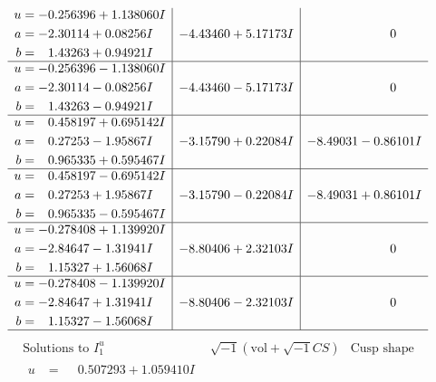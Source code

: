 \documentclass[1p]{elsarticle_modified}
\theoremstyle{definition}
\newcommand{\I}{\sqrt{-1}}
\begin{document}
$$\begin{array}{c|c|c}
\begin{aligned}
u &= -0.256396 + 1.138060 I \\
a &= -2.30114 + 0.08256 I \\
b &= \phantom{-}1.43263 + 0.94921 I\end{aligned}
 & -4.43460 + 5.17173 I & \phantom{-0.000000 } 0 \\ \hline\begin{aligned}
u &= -0.256396 - 1.138060 I \\
a &= -2.30114 - 0.08256 I \\
b &= \phantom{-}1.43263 - 0.94921 I\end{aligned}
 & -4.43460 - 5.17173 I & \phantom{-0.000000 } 0 \\ \hline\begin{aligned}
u &= \phantom{-}0.458197 + 0.695142 I \\
a &= \phantom{-}0.27253 - 1.95867 I \\
b &= \phantom{-}0.965335 + 0.595467 I\end{aligned}
 & -3.15790 + 0.22084 I & -8.49031 - 0.86101 I \\ \hline\begin{aligned}
u &= \phantom{-}0.458197 - 0.695142 I \\
a &= \phantom{-}0.27253 + 1.95867 I \\
b &= \phantom{-}0.965335 - 0.595467 I\end{aligned}
 & -3.15790 - 0.22084 I & -8.49031 + 0.86101 I \\ \hline\begin{aligned}
u &= -0.278408 + 1.139920 I \\
a &= -2.84647 - 1.31941 I \\
b &= \phantom{-}1.15327 + 1.56068 I\end{aligned}
 & -8.80406 + 2.32103 I & \phantom{-0.000000 } 0 \\ \hline\begin{aligned}
u &= -0.278408 - 1.139920 I \\
a &= -2.84647 + 1.31941 I \\
b &= \phantom{-}1.15327 - 1.56068 I\end{aligned}
 & -8.80406 - 2.32103 I & \phantom{-0.000000 } 0\\
 \hline 
 \end{array}$$\newpage$$\begin{array}{c|c|c}  
\text{Solutions to }I^u_{1}& \I (\text{vol} + \sqrt{-1}CS) & \text{Cusp shape}\\
 \hline 
\begin{aligned}
u &= \phantom{-}0.507293 + 1.059410 I \\

\end{aligned}
\end{array}$$
\end{document}
